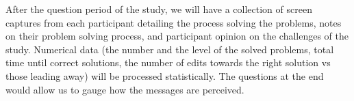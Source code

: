 \documentclass[submission,copyright,creativecommons]{eptcs}
\begin{document}
After the question period of the study, we will have a collection of screen captures from each participant detailing the process solving the problems, notes on their problem solving process, and participant opinion on the challenges of the study.
Numerical data (the number and the level of the solved problems, total time until correct solutions, the number of edits towards the right solution vs those leading away) will be processed statistically. 
The questions at the end would allow us to gauge how the messages are perceived.%
\end{document}
